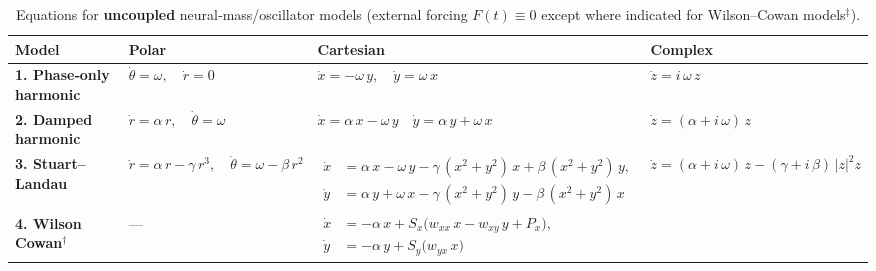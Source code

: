\begin{landscape}
\begin{table}[p]
    \centering
    \scriptsize
    \renewcommand{\arraystretch}{1.3}
    \caption{Equations for \textbf{uncoupled} neural‐mass/oscillator models (external forcing $F(t)\equiv0$ except where indicated for Wilson–Cowan models$^{\ddagger}$).}
    \label{tab:uncoupled_models}
    \begin{tabular}{@{}l  l  l  l@{}}
        \toprule
        \textbf{Model} & \textbf{Polar} & \textbf{Cartesian} & \textbf{Complex} \\ 
        \midrule

        \addlinespace[2ex]
        \textbf{1. Phase‐only harmonic} 
        & $\displaystyle \dot{\theta} = \omega,\quad \dot{r} = 0$
        & $\displaystyle \dot{x} = -\omega\,y,\quad \dot{y} = \omega\,x$
        & $\displaystyle \dot{z} = i\,\omega\,z$
        \\[2ex]

        \addlinespace[2ex]
        \textbf{2. Damped harmonic} 
        & $\displaystyle \dot{r} = \alpha\,r,\quad \dot{\theta} = \omega$
        & $\displaystyle \dot{x} =  \alpha\,x -\omega\,y\quad \dot{y} =  \alpha\,y + \omega\,x$
        & $\displaystyle \dot{z} = (\alpha + i\,\omega)\,z$
        \\[2ex]

        \addlinespace[2ex]
        \textbf{3. Stuart–Landau} 
        & $\displaystyle \dot{r} = \alpha\,r - \gamma\,r^{3},\quad \dot{\theta} = \omega - \beta\,r^{2}$
        & $\displaystyle
          \begin{aligned}
            \dot{x} &= \alpha\,x -\omega\,y 
                    - \gamma\,(x^{2}+y^{2})\,x
                    + \beta\,(x^{2}+y^{2})\,y,\\
            \dot{y} &= \alpha\,y + \omega\,x 
                    - \gamma\,(x^{2}+y^{2})\,y
                    - \beta\,(x^{2}+y^{2})\,x
          \end{aligned}$
        & $\displaystyle \dot{z} = (\alpha + i\,\omega)\,z 
          - (\gamma + i\,\beta)\,\lvert z\rvert^{2}z$
        \\[2ex]

        \addlinespace[2ex]
        \textbf{4. Wilson Cowan}$^{\dagger}$ 
        & --- 
        & $\displaystyle
         \begin{aligned}
          \dot{x} &= -\alpha\,x + S_x\bigl(w_{xx}\,x - w_{xy}\,y + P_x\bigr), \\ 
          \dot{y} &= -\alpha\,y + S_y\bigl(w_{yx}\,x \bigr)
          \end{aligned}$
          

\end{tabular}
\end{table}
\end{landscape}
